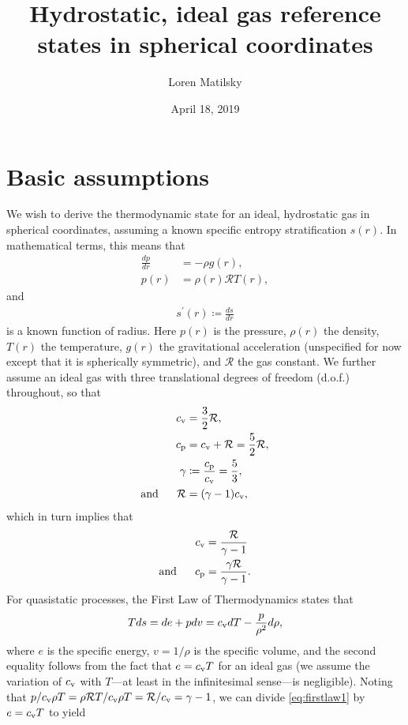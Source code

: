 \documentclass[12pt]{article} %
\date{April 18, 2019}
\author{Loren Matilsky}
\title{Hydrostatic, ideal gas reference states in spherical coordinates}
\newcommand{\cv}{c_{\rm{v}}}
\newcommand{\cp}{c_{\rm{p}}}
\newcommand{\andd}{\text{and}\ \ \ \ \ }
\begin{document}
	\maketitle
	\section{Basic assumptions}
	We wish to derive the thermodynamic state for an ideal, hydrostatic gas in spherical coordinates, assuming a known specific entropy stratification $s(r)$. In mathematical terms, this means that
	\begin{align}
	\frac{dp}{dr} &= -\rho g(r)\label{eq:hydr},\\
	p(r) &= \rho(r)\mathcal{R} T(r),\label{eq:idgas}
	\end{align}
	and 
	\begin{align}
	s^\prime(r) \coloneqq \frac{ds}{dr}
	\label{def:sgrad}
	\end{align}
	is a known function of radius. Here $p(r)$ is the pressure, $\rho(r)$ the density, $T(r)$ the temperature, $g(r)$ the gravitational acceleration (unspecified for now except that it is spherically symmetric), and $\mathcal{R}$ the gas constant. We further assume an ideal gas with three translational degrees of freedom (d.o.f.) throughout, so that
	\begin{subequations}	\label{eq:heats}
	\begin{align}
	\cv &=\frac{3}{2}\mathcal{R},\\
	\cp &= \cv + \mathcal{R} =\frac{5}{2}\mathcal{R},\\
	\gamma &\coloneqq \frac{\cp}{\cv} = \frac{5}{3},\\
	\text{and}\ \ \ \ \ \mathcal{R} &= (\gamma-1)\cv,
	\end{align}
	\end{subequations}
	which in turn implies that 
	\begin{subequations}\label{eq:heats2}
	\begin{align}
	\cv &= \frac{\mathcal{R}}{\gamma - 1}\label{eq:cv_from_gamma}\\
	\andd \cp &= \frac{\gamma\mathcal{R}}{\gamma - 1}\label{eq:cp_from_gamma}.
	\end{align}
	\end{subequations}
	For quasistatic processes, the First Law of Thermodynamics states that
	\begin{align}
	Tds=de+pdv= \cv dT - \frac{p}{\rho^2}d\rho,
	\label{eq:firstlaw1}
	\end{align}
	where $e$ is the specific energy, $v=1/\rho$ is the specific volume, and the second equality follows from the fact that $e=\cv T$ for an ideal gas (we assume the variation of $\cv$ with $T$---at least in the infinitesimal sense---is negligible). Noting that $p/\cv \rho T = \rho\mathcal{R} T/\cv \rho T = \mathcal{R}/\cv=\gamma - 1$, we can divide \eqref{eq:firstlaw1} by $e=\cv T$ to yield
\end{document}
